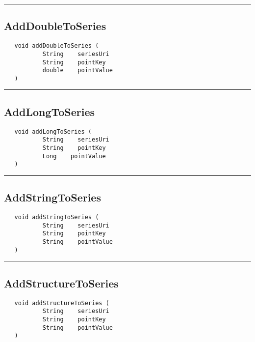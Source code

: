\rule{15cm}{2pt}
\subsection{AddDoubleToSeries}
\label{Api:AddDoubleToSeries}
\begin{verbatim}
   void addDoubleToSeries (
           String    seriesUri
           String    pointKey
           double    pointValue
   )
\end{verbatim}



\rule{15cm}{2pt}
\subsection{AddLongToSeries}
\label{Api:AddLongToSeries}
\begin{verbatim}
   void addLongToSeries (
           String    seriesUri
           String    pointKey
           Long    pointValue
   )
\end{verbatim}



\rule{15cm}{2pt}
\subsection{AddStringToSeries}
\label{Api:AddStringToSeries}
\begin{verbatim}
   void addStringToSeries (
           String    seriesUri
           String    pointKey
           String    pointValue
   )
\end{verbatim}



\rule{15cm}{2pt}
\subsection{AddStructureToSeries}
\label{Api:AddStructureToSeries}
\begin{verbatim}
   void addStructureToSeries (
           String    seriesUri
           String    pointKey
           String    pointValue
   )
\end{verbatim}



